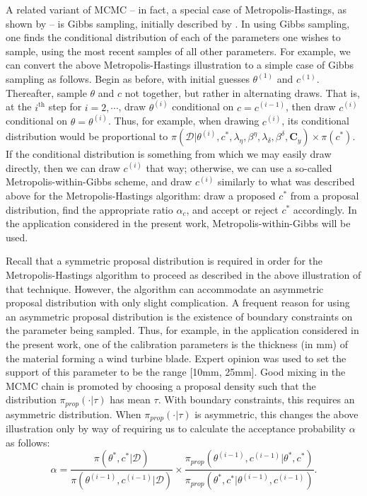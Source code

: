 \documentclass{article}
\begin{document}
A related variant of MCMC -- in fact, a special case of Metropolis-Hastings, as shown by \cite{Gelman1992} -- is Gibbs sampling, initially described by \cite{Geman1984}. In using Gibbs sampling, one finds the conditional distribution of each of the parameters one wishes to sample, using the most recent samples of all other parameters. For example, we can convert the above Metropolis-Hastings illustration to a simple case of Gibbs sampling as follows.
Begin as before, with initial guesses $\theta^{(1)}$ and $c^{(1)}$. Thereafter, sample $\theta$ and $c$ not together, but rather in alternating draws. That is, at the $i^{\text{th} }$ step for $i=2,\cdots$, draw $\theta^{(i)}$ conditional on $c=c^{(i-1)}$, then draw $c^{(i)}$ conditional on $\theta=\theta^{(i)}$. Thus, for example, when drawing $c^{(i)}$, its conditional distribution would be proportional to $\pi(\mathcal D | \theta^{(i)},c^{*},\lambda_\eta, \beta^\eta,\lambda_\delta,\beta^\delta,\mathbf C_y) \times \pi(c^{*})$. 
If the conditional distribution is something from which we may easily draw directly, then we can draw $c^{(i)}$ that way; otherwise, we can use a so-called Metropolis-within-Gibbs scheme, and draw $c^{(i)}$ similarly to what was described above for the Metropolis-Hastings algorithm: draw a proposed $c^*$ from a proposal distribution, find the appropriate ratio $\alpha_c$, and accept or reject $c^*$ accordingly. In the application considered in the present work, Metropolis-within-Gibbs will be used.


Recall that a symmetric proposal distribution is required in order for the Metropolis-Hastings algorithm to proceed as described in the above illustration of that technique. However, the algorithm can accommodate an asymmetric proposal distribution with only slight complication. A frequent reason for using an asymmetric proposal distribution is the existence of boundary constraints on the parameter being sampled. Thus, for example, in the application considered in the present work, one of the calibration parameters is the thickness (in mm) of the material forming a wind turbine blade. Expert opinion was used to set the support of this parameter to be the range [10mm, 25mm]. Good mixing in the MCMC chain is promoted by choosing a proposal density such that the distribution $\pi_{prop}(\cdot|\tau)$ has mean $\tau$. With boundary constraints, this requires an asymmetric distribution. When $\pi_{prop}(\cdot|\tau)$ is asymmetric, this changes the above illustration only by way of requiring us to calculate the acceptance probability $\alpha$ as follows:
\begin{equation}\label{eq:mh_correction}
\alpha = \frac{\pi(\theta^*,c^* | \mathcal D)}
{ \pi(\theta^{(i-1)},c^{(i-1)}|\mathcal D) } \times 
\frac{
\pi_{prop}(\theta^{(i-1)},c^{(i-1)}|\theta^*,c^*)
}{
\pi_{prop}(\theta^*,c^*|\theta^{(i-1)},c^{(i-1)})
}.
\end{equation}
\end{document}
